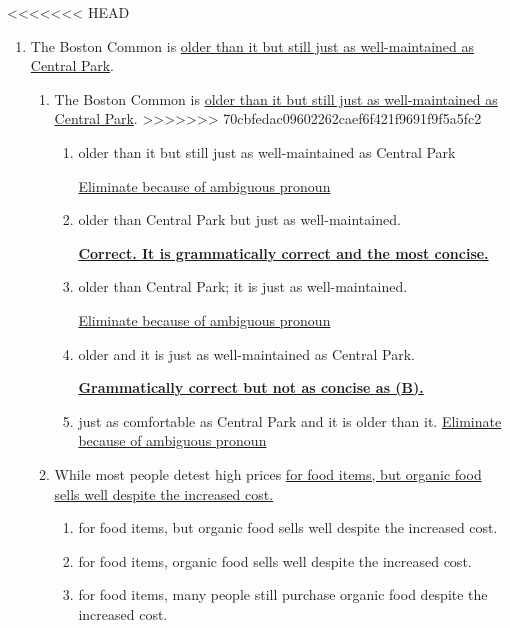 <<<<<<< HEAD
\begin{enumerate}
<<<<<<< HEAD
=======
\item The Boston Common is \ul{ older than it but still just as well-maintained as Central Park}.

\begin{enumerate}[label=(\Alph*)]
=======
>>>>>>> origin/master
\item The Boston Common is \ul{older than it but still just as well-maintained as Central Park}.
>>>>>>> 70cbfedac09602262caef6f421f9691f9f5a5fc2

\begin{enumerate}[label=(\Alph*)]
\item older than it but still just as well-maintained as Central Park

\ul{Eliminate because of ambiguous pronoun}
  
\item older than Central Park but just as well-maintained.

\textbf{\ul{Correct. It is grammatically correct and the most concise.}}

\item  older than Central Park; it is just as well-maintained.

\ul{Eliminate because of ambiguous pronoun}
  
\item older and it is just as well-maintained as Central Park.

\textbf{\ul{Grammatically correct but not as concise as (B).}}

\item just as comfortable as Central Park and it is older than it. \ul{Eliminate because of ambiguous pronoun}
\end{enumerate}

\bigskip
\item While most people detest high prices \ul{for food items, but organic food sells well despite the increased cost.}

\bigskip
\begin{enumerate}[label=(\Alph*)]
\item for food items, but organic food sells well despite the increased cost. \hrulefill
 
\item for food items, organic food sells well despite the increased cost. \hrulefill
 
\item for food items, many people still purchase organic food despite the increased cost. \hrulefill


\end{enumerate}
\end{enumerate}
\end{enumerate}
